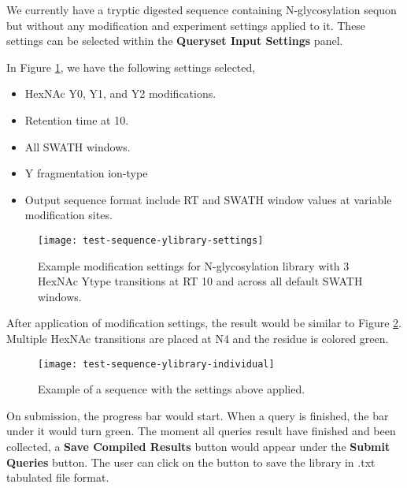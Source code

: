 \documentclass[../manual.tex]{subfiles}
\begin{document}
We currently have a tryptic digested sequence containing N-glycosylation sequon but without any modification and experiment settings applied to it. These settings can be selected within the \textbf{Queryset Input Settings} panel.

In Figure \ref{fig:testsequenceylibrarysettings}, we have the following settings selected,
\begin{itemize}
	\item HexNAc Y0, Y1, and Y2 modifications.
	\item Retention time at 10.
	\item All SWATH windows.
	\item Y fragmentation ion-type
	\item Output sequence format include RT and SWATH window values at variable modification sites.
\end{itemize}
\begin{figure}[H]
	\centering
	\begin{framed}
        \centering
        \begin{adjustbox}{width=1\textwidth}
			\texttt{[image: test-sequence-ylibrary-settings]}
		\end{adjustbox}
		\caption{Example modification settings for N-glycosylation library with 3 HexNAc Ytype transitions at RT 10 and across all default SWATH windows.}\label{fig:testsequenceylibrarysettings}
	\end{framed}
\end{figure}
After application of modification settings, the result would be similar to Figure \ref{fig:testsequenceylibraryindividual}. Multiple HexNAc transitions are placed at N4 and the residue is colored green.
\begin{figure}[H]
	\centering
	\begin{framed}
        \centering
        \begin{adjustbox}{width=1\textwidth}
			\texttt{[image: test-sequence-ylibrary-individual]}
		\end{adjustbox}
		\caption{Example of a sequence with the settings above applied.}\label{fig:testsequenceylibraryindividual}
	\end{framed}
\end{figure}

On submission, the progress bar would start. When a query is finished, the bar under it would turn green. The moment all queries result have finished and been collected, a \textbf{Save Compiled Results} button would appear under the \textbf{Submit Queries} button. The user can click on the button to save the library in .txt tabulated file format.
\end{document}
